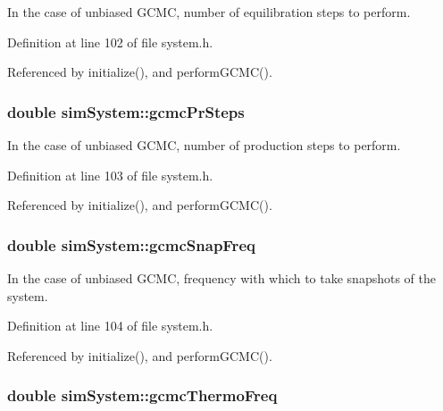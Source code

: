 In the case of unbiased G\-C\-M\-C, number of equilibration steps to perform. 



Definition at line 102 of file system.\-h.



Referenced by initialize(), and perform\-G\-C\-M\-C().

\hypertarget{classsim_system_ae477ed10d350665f6065774a12f884c8}{
\subsubsection[{gcmc\-Pr\-Steps}]{\setlength{\rightskip}{0pt plus 5cm}double sim\-System\-::gcmc\-Pr\-Steps}}\label{classsim_system_ae477ed10d350665f6065774a12f884c8}


In the case of unbiased G\-C\-M\-C, number of production steps to perform. 



Definition at line 103 of file system.\-h.



Referenced by initialize(), and perform\-G\-C\-M\-C().

\hypertarget{classsim_system_ad899e42a50a3ae94ac18663bca5bd8b3}{
\subsubsection[{gcmc\-Snap\-Freq}]{\setlength{\rightskip}{0pt plus 5cm}double sim\-System\-::gcmc\-Snap\-Freq}}\label{classsim_system_ad899e42a50a3ae94ac18663bca5bd8b3}


In the case of unbiased G\-C\-M\-C, frequency with which to take snapshots of the system. 



Definition at line 104 of file system.\-h.



Referenced by initialize(), and perform\-G\-C\-M\-C().

\hypertarget{classsim_system_a91d057904fa4d57543fef4133294899f}{
\subsubsection[{gcmc\-Thermo\-Freq}]{\setlength{\rightskip}{0pt plus 5cm}double sim\-System\-::gcmc\-Thermo\-Freq}}\label{classsim_system_a91d057904fa4d57543fef4133294899f}


